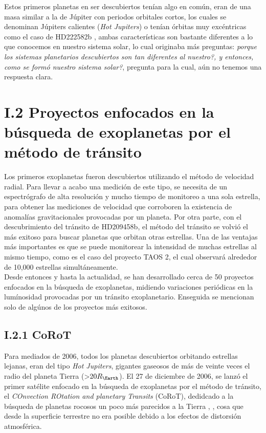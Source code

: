 Estos primeros planetas en ser descubiertos tenían algo en común, eran de una masa similar a la de Júpiter con periodos orbitales cortos, los cuales se denominan Júpiters calientes (\textit{Hot Jupiters}) o tenían órbitas muy excéntricas como el caso de HD222582b \cite{vogt2000six}, ambas características son bastante diferentes a lo que conocemos en nuestro sistema solar, lo cual originaba más preguntas: \textit{porque los sistemas planetarios descubiertos son tan diferentes al nuestro?, y entonces, como se formó nuestro sistema solar?}, pregunta para la cual, aún no tenemos una respuesta clara.\\

\section*{I.2 Proyectos enfocados en la búsqueda de exoplanetas por el método de tránsito}

Los primeros exoplanetas fueron descubiertos utilizando el método de velocidad radial. Para llevar a acabo una medición de este tipo, se necesita de un espectrógrafo de alta resolución y mucho tiempo de monitoreo a una sola estrella, para obtener las mediciones de velocidad que corroboren la existencia de anomalías gravitacionales provocadas por un planeta. Por otra parte, con el descubrimiento del tránsito de HD209458b, el método del tránsito se volvió el más exitoso para buscar planetas que orbitan otras estrellas. Una de las ventajas más importantes es que se puede monitorear la intensidad de muchas estrellas al mismo tiempo, como es el caso del proyecto TAOS 2, el cual observará alrededor de 10,000 estrellas simultáneamente.\\

Desde entonces y hasta la actualidad, se han desarrollado cerca de 50 proyectos enfocados en la búsqueda de exoplanetas, midiendo variaciones periódicas en la lumínosidad provocadas por un tránsito exoplanetario. Enseguida se mencionan solo de algúnos de los proyectos más exitosos.\\

\subsection*{I.2.1 CoRoT}

Para mediados de 2006, todos los planetas descubiertos orbitando estrellas lejanas, eran del tipo \textit{Hot Jupiters}, gigantes gaseosos de más de veinte veces el radio del planeta Tierra (>$20R_{\Earth}$). El 27 de diciembre de 2006, se lanzó el primer satélite enfocado en la búsqueda de exoplanetas por el método de tránsito, el \textit{COnvection ROtation and planetary Transits} (CoRoT), dedidcado a la búsqueda de planetas rocosos un poco más parecidos a la Tierra \cite{aigrain2007corot}, \cite{barge2007corot}, cosa que desde la superficie terrestre no era posible debido a los efectos de distorsión atmosférica.\\

